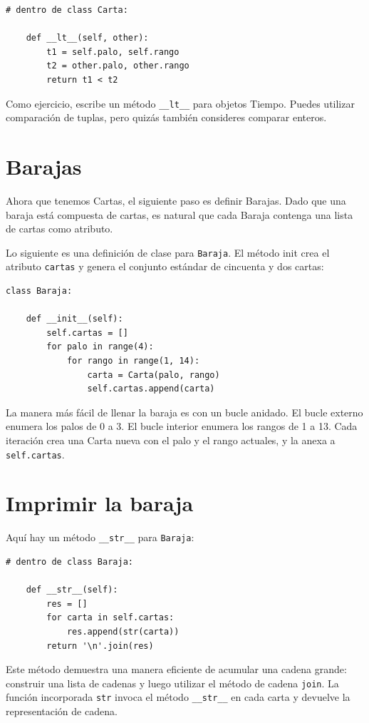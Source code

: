 \documentclass[10pt]{book}
\begin{document}
\begin{verbatim}
# dentro de class Carta:

    def __lt__(self, other):
        t1 = self.palo, self.rango
        t2 = other.palo, other.rango
        return t1 < t2
\end{verbatim}
%
Como ejercicio, escribe un método \verb"__lt__" para objetos Tiempo.  Puedes
utilizar comparación de tuplas, pero quizás también consideres
comparar enteros.


\section{Barajas}

Ahora que tenemos Cartas, el siguiente paso es definir Barajas.  Dado que una
baraja está compuesta de cartas, es natural que cada Baraja contenga una
lista de cartas como atributo.


Lo siguiente es una definición de clase para {\tt Baraja}.  El
método init crea el atributo {\tt cartas} y genera
el conjunto estándar de cincuenta y dos cartas:

\begin{verbatim}
class Baraja:

    def __init__(self):
        self.cartas = []
        for palo in range(4):
            for rango in range(1, 14):
                carta = Carta(palo, rango)
                self.cartas.append(carta)
\end{verbatim}
%
La manera más fácil de llenar la baraja es con un bucle anidado.  El bucle externo
enumera los palos de 0 a 3.  El bucle interior enumera los
rangos de 1 a 13.  Cada iteración
crea una Carta nueva con el palo y el rango actuales,
y la anexa a {\tt self.cartas}.


\section{Imprimir la baraja}
\label{printdeck}

Aquí hay un método \verb"__str__" para {\tt Baraja}:

\begin{verbatim}
# dentro de class Baraja:

    def __str__(self):
        res = []
        for carta in self.cartas:
            res.append(str(carta))
        return '\n'.join(res)
\end{verbatim}
%
Este método demuestra una manera eficiente de acumular una cadena
grande: construir una lista de cadenas y luego utilizar el método de cadena
{\tt join}.  La función incorporada {\tt str} invoca el método
\verb"__str__" en cada carta y devuelve la representación
de cadena.   
  
\end{document}
